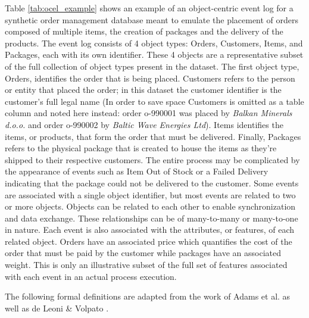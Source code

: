         Table \ref{tab:ocel_example} shows an example of an object-centric event log for a synthetic order management database meant to emulate the placement of orders composed of multiple items, the creation of packages and the delivery of the products. The event log consists of 4 object types: Orders, Customers, Items, and Packages, each with its own identifier. These 4 objects are a representative subset of the full collection of object types present in the dataset. The first object type, Orders, identifies the order that is being placed. Customers refers to the person or entity that placed the order; in this dataset the customer identifier is the customer's full legal name (In order to save space Customers is omitted as a table column and noted here instead: order o-990001 was placed by \emph{Balkan Minerals d.o.o.} and order o-990002 by \emph{Baltic Wave Energies Ltd}). Items identifies the items, or products, that form the order that must be delivered. Finally, Packages refers to the physical package that is created to house the items as they're shipped to their respective customers. The entire process may be complicated by the appearance of events such as Item Out of Stock or a Failed Delivery indicating that the package could not be delivered to the customer. Some events are associated with a single object identifier, but most events are related to two or more objects.
        Objects can be related to each other to enable synchronization and data exchange. These relationships can be of many-to-many or many-to-one in nature. Each event is also associated with the attributes, or features, of each related object. Orders have an associated price which quantifies the cost of the order that must be paid by the customer while packages have an associated weight. This is only an illustrative subset of the full set of features associated with each event in an actual process execution. 
        
        The following formal definitions are adapted from the work of Adams et al. \cite{adams2022} as well as de Leoni \& Volpato \cite{deleonieVolpato}.

